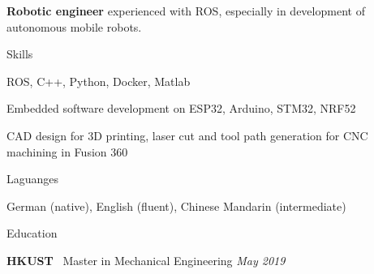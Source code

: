 \documentclass[
	a4paper, %
	11pt, %
]{resume} %
\begin{document}
\textbf{Robotic engineer} experienced with ROS, especially in development of autonomous mobile robots.


\begin{rSection}{Skills}

	\item ROS, C++, Python, Docker, Matlab
	\item Embedded software development on ESP32, Arduino, STM32, NRF52
	\item CAD design for 3D printing, laser cut and tool path generation for CNC machining in Fusion 360

\end{rSection}



\begin{rSection}{Laguanges}
	\item German (native), English (fluent), Chinese Mandarin (intermediate)

\end{rSection}



\begin{rSection}{Education}
	
	\textbf{HKUST} \ Master in Mechanical Engineering \hfill \textit{May 2019}

	
\end{rSection}

\end{document}
